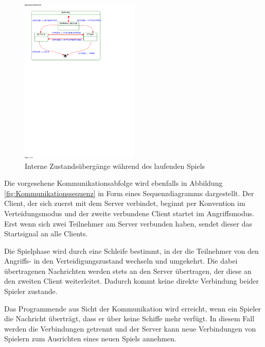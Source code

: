 \begin{figure}[H]
  \centering
  \includegraphics[trim=10mm 185mm 60mm 10mm,clip,width=0.5\textwidth]{images/SubSMRUNNING.pdf}
  \caption{Interne Zustandsübergänge während des laufenden Spiels}
  \label{fig:SubClientstates}
\end{figure}

Die vorgesehene Kommunikationsabfolge wird ebenfalls in Abbildung \ref{fig:Kommunikationssequenz} in Form eines Sequenzdiagramms dargestellt.
Der Client, der sich zuerst mit dem Server verbindet, beginnt per Konvention im Verteidungsmodus und der zweite verbundene Client startet im Angriffsmodus.
Erst wenn sich zwei Teilnehmer am Server verbunden haben, sendet dieser das Startsignal an alle Clients.

Die Spielphase wird durch eine Schleife bestimmt, in der die Teilnehmer von den Angriffs- in den Verteidigungszustand wechseln und umgekehrt.
Die dabei übertragenen Nachrichten werden stets an den Server übertragen, der diese an den zweiten Client weiterleitet.
Dadurch kommt keine direkte Verbindung beider Spieler zustande.

Das Programmende aus Sicht der Kommunikation wird erreicht, wenn ein Spieler die Nachricht überträgt, dass er über keine Schiffe mehr verfügt.
In diesem Fall werden die Verbindungen getrennt und der Server kann neue Verbindungen von Spielern zum Ausrichten eines neuen Spiels annehmen.

